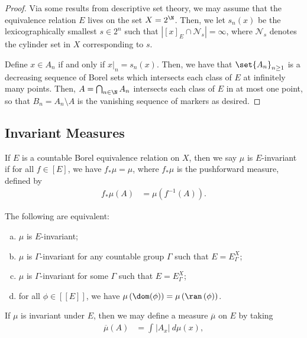 \documentclass[10pt]{mypackage}
\begin{document}
\begin{proof}
  Via some results from descriptive set theory, we may assume that the equivalence relation $E$ lives on the set $X = 2^{\N}$. Then, we let $s_n(x)$ be the lexicographically smallest $s\in 2^{n}$ such that $\left\vert [x]_E\cap \mathcal{N}_s \right\vert= \infty$, where $\mathcal{N}_s$ denotes the cylinder set in $X$ corresponding to $s$.

  Define $x\in A_n$ if and only if $x|_{n} = s_n(x)$. Then, we have that $\set{A_n}_{n\geq 1}$ is a decreasing sequence of Borel sets which intersects each class of $E$ at infinitely many points. Then, $A = \bigcap_{n\in \N}A_n$ intersects each class of $E$ in at most one point, so that $B_n = A_n\setminus A$ is the vanishing sequence of markers as desired.
\end{proof}
\subsection{Invariant Measures}%
\begin{definition}
  If $E$ is a countable Borel equivalence relation on $X$, then we say $\mu$ is $E$-invariant if for all $f\in \left[ E \right]$, we have $f_{\ast}\mu = \mu$, where $f_{\ast}\mu$ is the pushforward measure, defined by
  \begin{align*}
    f_{\ast}\mu(A) &= \mu\left( f^{-1}\left( A \right) \right).
  \end{align*}
\end{definition}
\begin{proposition}
  The following are equivalent:
  \begin{enumerate}[(a)]
    \item $\mu$ is $E$-invariant;
    \item $\mu$ is $\Gamma$-invariant for any countable group $\Gamma$ such that $E = E_{\Gamma}^X$;
    \item $\mu$ is $\Gamma$-invariant for some $\Gamma$ such that $E = E_{\Gamma}^X$;
    \item for all $\phi\in \left[ \left[ E \right] \right]$, we have $\mu\left( \dom(\phi) \right) = \mu\left( \ran\left( \phi \right) \right)$.
  \end{enumerate}
\end{proposition}
If $\mu$ is invariant under $E$, then we may define a measure $ \overline{\mu} $ on $E$ by taking
\begin{align*}
  \overline{\mu}\left( A \right) &= \int_{}^{} \left\vert A_x \right\vert\:d\mu(x),
\end{align*}
\end{document}
